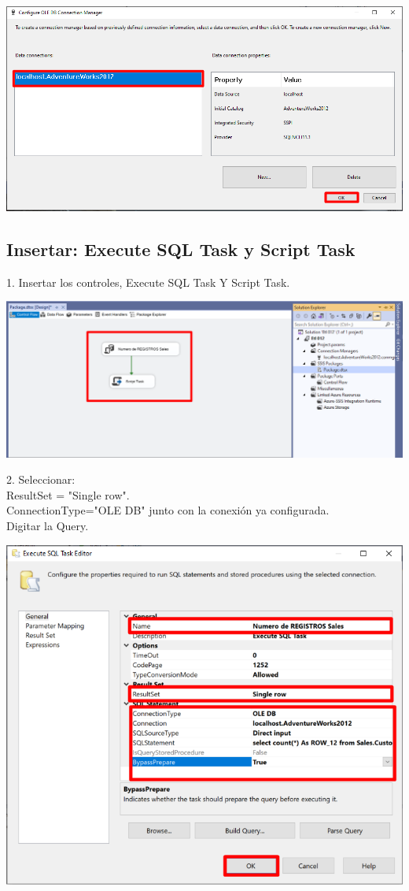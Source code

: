 \documentclass[12pt,letterpaper]{article}
\begin{document}
	\begin{center}
		\includegraphics[width=16cm]{./img/25}
	\end{center}
	
\subsection*{Insertar: Execute SQL Task y Script Task}	
1. Insertar los controles, Execute SQL Task Y Script Task.
	\begin{center}
	\includegraphics[width=16cm]{./img/34}
	\end{center}
2. Seleccionar:
\\ResultSet = "Single row".
\\ConnectionType="OLE DB" junto con la conexión ya configurada.
\\Digitar la Query.  		
	\begin{center}
	\includegraphics[width=15cm]{./img/32}
	\end{center}
\end{document}
